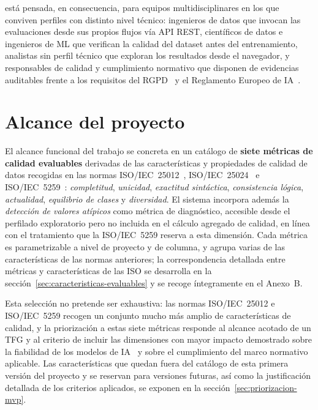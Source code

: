\dataqual está pensada, en consecuencia, para equipos multidisciplinares en
los que conviven perfiles con distinto nivel técnico: ingenieros de datos
que invocan las evaluaciones desde sus propios flujos vía \ac{API}
\ac{REST}, científicos de datos e ingenieros de \ac{ML} que verifican la
calidad del dataset antes del entrenamiento, analistas sin perfil técnico
que exploran los resultados desde el navegador, y responsables de calidad
y cumplimiento normativo que disponen de evidencias auditables frente a
los requisitos del \ac{RGPD}~\citep{rgpd2016} y el Reglamento Europeo de
\ac{IA}~\citep{aiact2024}.


\section{Alcance del proyecto}
\label{sec:alcance-intro}

El alcance funcional del trabajo se concreta en un catálogo de
\textbf{siete métricas de calidad evaluables} derivadas de las
características y propiedades de calidad de datos recogidas en las normas
\ac{ISO}/\ac{IEC}~25012~\citep{iso25012},
\ac{ISO}/\ac{IEC}~25024~\citep{iso25024} e
\ac{ISO}/\ac{IEC}~5259~\citep{iso5259}: \emph{completitud}, \emph{unicidad},
\emph{exactitud sintáctica}, \emph{consistencia lógica}, \emph{actualidad},
\emph{equilibrio de clases} y \emph{diversidad}.  El sistema incorpora
además la \emph{detección de valores atípicos} como métrica de
diagnóstico, accesible desde el perfilado exploratorio pero no incluida en
el cálculo agregado de calidad, en línea con el tratamiento que la
\ac{ISO}/\ac{IEC}~5259 reserva a esta dimensión.  Cada métrica es
parametrizable a nivel de proyecto y de columna, y agrupa varias de las
características de las normas anteriores; la correspondencia detallada
entre métricas y características de las \ac{ISO} se desarrolla en la
sección~\ref{sec:caracteristicas-evaluables} y se recoge íntegramente en
el Anexo~B.

Esta selección no pretende ser exhaustiva: las normas \ac{ISO}/\ac{IEC}~25012 e
\ac{ISO}/\ac{IEC}~5259 recogen un conjunto mucho más amplio de características
de calidad, y la priorización a estas siete métricas responde al alcance
acotado de un \ac{TFG} y al criterio de incluir las dimensiones con mayor
impacto demostrado sobre la fiabilidad de los modelos de
\ac{IA}~\citep{mohammed2025} y sobre el cumplimiento del marco normativo
aplicable.  Las características que
quedan fuera del catálogo de esta primera versión del proyecto y se
reservan para versiones futuras, así como la justificación detallada de
los criterios aplicados, se exponen en la
sección~\ref{sec:priorizacion-mvp}.

